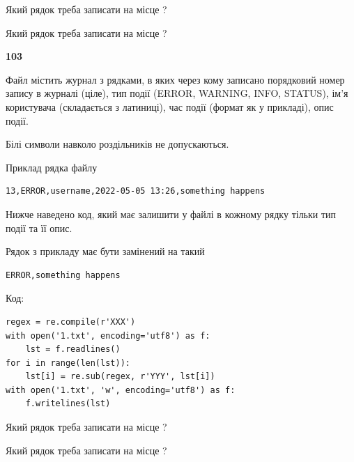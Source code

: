 Який рядок треба записати на місце  ?\par
\vspace{5mm}


Який рядок треба записати на місце  ?\par


\newpage

{\begin {center}\textbf{ 103}\end {center}}\par
Файл  містить журнал з рядками, в яких через кому записано поряд\-ко\-вий номер запису в журналі (ціле), тип події (ERROR, WARNING, INFO, STATUS), ім'я користувача (складається з латиниці), час події (фор\-мат як у прикладі), опис події.

Білі символи навколо роздільників не допускаються.

Приклад рядка файлу



\begin{verbatim}
13,ERROR,username,2022-05-05 13:26,something happens
\end{verbatim}


Нижче наведено код, який має залишити у файлі в кожному рядку тільки тип події та її опис.

Рядок з прикладу має бути замінений на такий



\begin{verbatim}
ERROR,something happens
\end{verbatim}




Код:



\begin{verbatim}
regex = re.compile(r'XXX')
with open('1.txt', encoding='utf8') as f:
    lst = f.readlines()
for i in range(len(lst)):
    lst[i] = re.sub(regex, r'YYY', lst[i])
with open('1.txt', 'w', encoding='utf8') as f:
    f.writelines(lst)
\end{verbatim}









Який рядок треба записати на місце  ?\par
\vspace{5mm}


Який рядок треба записати на місце  ?\par


